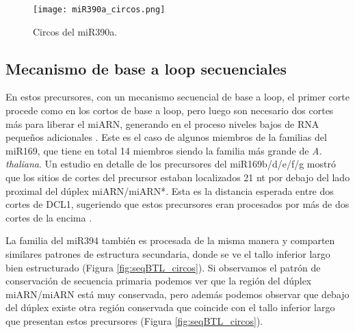 \begin{figure}[htbp!] 
    \centering    
    \texttt{[image: miR390a\_circos.png]}
    \caption[Circos del miR172a]{Circos del miR390a.}
     \label{fig:miR390a_circos}
\end{figure}

\subsection{Mecanismo de base a loop secuenciales}

En estos precursores, con un mecanismo secuencial de base a loop, el primer corte procede como en los cortos de base a loop, pero luego son necesario dos cortes más para liberar el miARN, generando en el proceso niveles bajos de RNA pequeños adicionales \citep{Bologna2013}.
Este es el caso de algunos miembros de la  familias del miR169, que tiene en total 14 miembros siendo la familia más grande de \textit{A. thaliana}.
Un estudio en detalle de los precursores del miR169b/d/e/f/g mostró que los sitios de cortes del precursor estaban localizados 21 nt por debajo del lado proximal del dúplex miARN/miARN*.
Esta es la distancia esperada entre dos cortes de DCL1, sugeriendo que estos precursores eran procesados por más de dos cortes de la encima \citep{Bologna2013}.

La familia del miR394 también es procesada de la misma manera y comparten similares patrones de estructura secundaria, donde se ve el tallo inferior largo bien estructurado (Figura \ref{fig:seqBTL_circos}).
Si observamos el patrón de conservación de secuencia primaria podemos ver que la región del dúplex miARN/miARN está muy conservada, pero además podemos observar que debajo del dúplex existe otra región conservada que coincide con el tallo inferior largo que presentan estos precursores (Figura \ref{fig:seqBTL_circos}).


